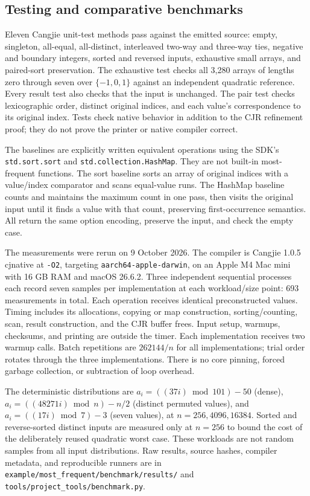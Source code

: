 \subsection{Testing and comparative benchmarks}

Eleven Cangjie unit-test methods pass against the emitted source: empty,
singleton, all-equal, all-distinct, interleaved two-way and three-way ties,
negative and boundary integers, sorted and reversed inputs, exhaustive
small arrays, and paired-sort preservation. The exhaustive test checks all
3,280 arrays of lengths zero through seven over $\{-1,0,1\}$ against an
independent quadratic reference. Every result test also checks that the
input is unchanged. The pair test checks lexicographic order, distinct
original indices, and each value's correspondence to its original index.
Tests check native behavior in addition to the CJR refinement proof;
they do not prove the printer or native compiler correct.

The baselines are explicitly written equivalent operations using the
SDK's \texttt{std.sort.sort} and \texttt{std.collection.HashMap}. They
are not built-in most-frequent functions. The sort baseline sorts an array
of original indices with a value/index comparator and scans equal-value
runs. The HashMap baseline counts and maintains the maximum count in one
pass, then visits the original input until it finds a value with that
count, preserving first-occurrence semantics. All return the same option
encoding, preserve the input, and check the empty case.

The measurements were rerun on 9 October 2026. The compiler is Cangjie 1.0.5 cjnative at \texttt{-O2}, targeting
\texttt{aarch64-apple-darwin}, on an Apple M4 Mac mini with 16 GB RAM and
macOS 26.6.2. Three independent sequential processes each record seven
samples per implementation at each workload/size point: 693 measurements
in total. Each operation receives identical preconstructed values. Timing
includes its allocations, copying or map construction, sorting/counting,
scan, result construction, and the CJR buffer frees. Input setup, warmups,
checksums, and printing are outside the timer. Each implementation receives
two warmup calls. Batch repetitions are $262144/n$ for all implementations;
trial order rotates through the three implementations. There is no core
pinning, forced garbage collection, or subtraction of loop overhead.

The deterministic distributions are
$a_i=((37i)\bmod101)-50$ (dense),
$a_i=((48271i)\bmod n)-n/2$ (distinct permuted values), and
$a_i=((17i)\bmod7)-3$ (seven values), at $n=256,4096,16384$.
Sorted and reverse-sorted distinct inputs are measured only at $n=256$
to bound the cost of the deliberately reused quadratic worst case.
These workloads are not random samples from all input distributions.
Raw results, source hashes, compiler metadata, and reproducible runners
are in \texttt{example/most\_frequent/benchmark/results/} and
\texttt{tools/project\_tools/benchmark.py}.

